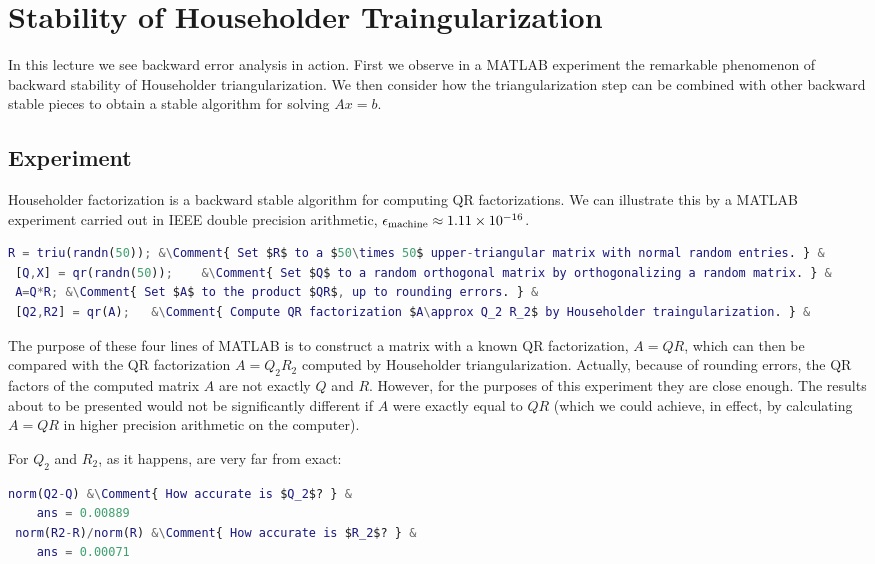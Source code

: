 \chapter{Stability of Householder Traingularization}

In this lecture we see backward error analysis in action. First we observe in a MATLAB experiment the remarkable phenomenon of backward stability of Householder triangularization. We then consider how the triangularization step can be combined with other backward stable pieces to obtain a stable algorithm for solving $A x=b$. 

\section{Experiment} 

Householder factorization is a backward stable algorithm for computing QR factorizations. We can illustrate this by a MATLAB experiment carried out in IEEE double precision arithmetic, $\epsilon_{\text{machine}}\approx 1.11\times 10^{-16}$. 

\begin{lstlisting}[language=Matlab]
 R = triu(randn(50)); &\Comment{ Set $R$ to a $50\times 50$ upper-triangular matrix with normal random entries. } & 
 [Q,X] = qr(randn(50));    &\Comment{ Set $Q$ to a random orthogonal matrix by orthogonalizing a random matrix. } &
 A=Q*R; &\Comment{ Set $A$ to the product $QR$, up to rounding errors. } &
 [Q2,R2] = qr(A);   &\Comment{ Compute QR factorization $A\approx Q_2 R_2$ by Householder traingularization. } &
\end{lstlisting}

The purpose of these four lines of MATLAB is to construct a matrix with a known QR factorization, $A=Q R$, which can then be compared with the QR factorization $A=Q_2 R_2$ computed by Householder triangularization. Actually, because of rounding errors, the QR factors of the computed matrix $A$ are not exactly $Q$ and $R$. However, for the purposes of this experiment they are close enough. The results about to be presented would not be significantly different if $A$ were exactly equal to $Q R$ (which we could achieve, in effect, by calculating $A=Q R$ in higher precision arithmetic on the computer). 

For $Q_2$ and $R_2$, as it happens, are very far from exact:

\begin{lstlisting}[language=Matlab]
 norm(Q2-Q) &\Comment{ How accurate is $Q_2$? } &
    ans = 0.00889 
 norm(R2-R)/norm(R) &\Comment{ How accurate is $R_2$? } &
    ans = 0.00071
\end{lstlisting}

